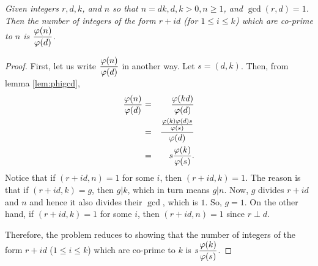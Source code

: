 \documentclass[12pt]{subfile}
\begin{document}
	
		\begin{theorem}\slshape \label{thm:menon-lemma}
			Given integers $r,d, k$, and $n$ so that $n=dk, d, k>0,n\geq1$, and $\gcd(r,d)=1$. Then the number of integers of the form $r+id$ (for $1 \leq i \leq k$) which are co-prime to $n$ is $\dfrac{\varphi (n)}{\varphi (d)}$.
		\end{theorem}
		
		\begin{proof}
			First, let us write $\dfrac{\varphi (n)}{\varphi (d)}$ in another way. Let $s = (d,k)$. Then, from lemma \eqref{lem:phigcd},
				\begin{eqnarray*}
					\dfrac{\varphi (n)}{\varphi (d)} &=& \dfrac{\varphi (kd)}{\varphi (d)}\\
										   &=& \dfrac{\frac{\varphi(k) \varphi(d) s}{\varphi(s)}}{\varphi(d)}\\
										   &=& s \dfrac{\varphi(k)}{\varphi(s)}.
				\end{eqnarray*}
			Notice that if $(r+id , n)=1$ for some $i$, then $(r+id , k) = 1$. The reason is that if $(r+id , k) = g$, then $g | k$, which in turn means $g|n$. Now, $g$ divides $r+id$ and $n$ and hence it also divides their $\gcd$, which is $1$. So, $g=1$. On the other hand, if $(r+id, k)=1$ for some $i$, then $(r+id, n)=1$ since $r \perp d$.
			
			Therefore, the problem reduces to showing that the number of integers of the form $r+id$ ($1 \leq i \leq k$) which are co-prime to $k$ is $s \dfrac{\varphi(k)}{\varphi(s)}$.
			

\end{proof}
\end{document}
